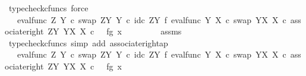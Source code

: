 \begin{isabellebody}
\ {\isacharparenleft}{\kern0pt}typecheck{\isacharunderscore}{\kern0pt}cfuncs{\isacharcomma}{\kern0pt}\ force{\isacharparenright}{\kern0pt}\isanewline
\ \ \ \ \isamarkupfalse%
\ \isamarkupfalse%
\ {\isachardoublequoteopen}{\isachardot}{\kern0pt}{\isachardot}{\kern0pt}{\isachardot}{\kern0pt}\ {\isacharequal}{\kern0pt}\ {\isacharparenleft}{\kern0pt}eval{\isacharunderscore}{\kern0pt}func\ Z\ Y\ {\isasymcirc}\isactrlsub c\ swap\ {\isacharparenleft}{\kern0pt}Z\isactrlbsup Y\isactrlesup {\isacharparenright}{\kern0pt}\ Y\ {\isasymcirc}\isactrlsub c\ {\isacharparenleft}{\kern0pt}id\isactrlsub c\ {\isacharparenleft}{\kern0pt}Z\isactrlbsup Y\isactrlesup {\isacharparenright}{\kern0pt}\ {\isasymtimes}\isactrlsub f\ eval{\isacharunderscore}{\kern0pt}func\ Y\ X\ {\isasymcirc}\isactrlsub c\ swap\ {\isacharparenleft}{\kern0pt}Y\isactrlbsup X\isactrlesup {\isacharparenright}{\kern0pt}\ X{\isacharparenright}{\kern0pt}{\isacharparenright}{\kern0pt}\ {\isasymcirc}\isactrlsub c\ associate{\isacharunderscore}{\kern0pt}right\ {\isacharparenleft}{\kern0pt}Z\isactrlbsup Y\isactrlesup {\isacharparenright}{\kern0pt}\ {\isacharparenleft}{\kern0pt}Y\isactrlbsup X\isactrlesup {\isacharparenright}{\kern0pt}\ X\ {\isasymcirc}\isactrlsub c\ \ \ {\isasymlangle}{\isasymlangle}f{\isacharcomma}{\kern0pt}g{\isasymrangle}{\isacharcomma}{\kern0pt}\ x\ {\isasymrangle}{\isachardoublequoteclose}\isanewline
\ \ \ \ \ \ \isamarkupfalse%
\ assms\ \isamarkupfalse%
\ {\isacharparenleft}{\kern0pt}typecheck{\isacharunderscore}{\kern0pt}cfuncs{\isacharcomma}{\kern0pt}\ simp\ add{\isacharcolon}{\kern0pt}\ associate{\isacharunderscore}{\kern0pt}right{\isacharunderscore}{\kern0pt}ap{\isacharparenright}{\kern0pt}\isanewline
\ \ \ \ \isamarkupfalse%
\ \isamarkupfalse%
\ {\isachardoublequoteopen}{\isachardot}{\kern0pt}{\isachardot}{\kern0pt}{\isachardot}{\kern0pt}\ {\isacharequal}{\kern0pt}\ {\isacharparenleft}{\kern0pt}eval{\isacharunderscore}{\kern0pt}func\ Z\ Y\ {\isasymcirc}\isactrlsub c\ swap\ {\isacharparenleft}{\kern0pt}Z\isactrlbsup Y\isactrlesup {\isacharparenright}{\kern0pt}\ Y\ {\isasymcirc}\isactrlsub c\ {\isacharparenleft}{\kern0pt}id\isactrlsub c\ {\isacharparenleft}{\kern0pt}Z\isactrlbsup Y\isactrlesup {\isacharparenright}{\kern0pt}\ {\isasymtimes}\isactrlsub f\ eval{\isacharunderscore}{\kern0pt}func\ Y\ X\ {\isasymcirc}\isactrlsub c\ swap\ {\isacharparenleft}{\kern0pt}Y\isactrlbsup X\isactrlesup {\isacharparenright}{\kern0pt}\ X{\isacharparenright}{\kern0pt}\ {\isasymcirc}\isactrlsub c\ associate{\isacharunderscore}{\kern0pt}right\ {\isacharparenleft}{\kern0pt}Z\isactrlbsup Y\isactrlesup {\isacharparenright}{\kern0pt}\ {\isacharparenleft}{\kern0pt}Y\isactrlbsup X\isactrlesup {\isacharparenright}{\kern0pt}\ X{\isacharparenright}{\kern0pt}\ {\isasymcirc}\isactrlsub c\ \ \ {\isasymlangle}{\isasymlangle}f{\isacharcomma}{\kern0pt}g{\isasymrangle}{\isacharcomma}{\kern0pt}\ x\ {\isasymrangle}{\isachardoublequoteclose}\isanewline

\end{isabellebody}
